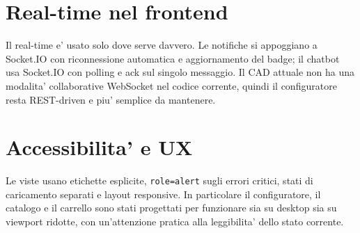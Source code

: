 \section{Real-time nel frontend}

Il real-time e' usato solo dove serve davvero. Le notifiche si appoggiano a Socket.IO con riconnessione automatica e aggiornamento del badge; il chatbot usa Socket.IO con polling e ack sul singolo messaggio. Il CAD attuale non ha una modalita' collaborative WebSocket nel codice corrente, quindi il configuratore resta REST-driven e piu' semplice da mantenere.

\section{Accessibilita' e UX}

Le viste usano etichette esplicite, \texttt{role=alert} sugli errori critici, stati di caricamento separati e layout responsive. In particolare il configuratore, il catalogo e il carrello sono stati progettati per funzionare sia su desktop sia su viewport ridotte, con un'attenzione pratica alla leggibilita' dello stato corrente.
